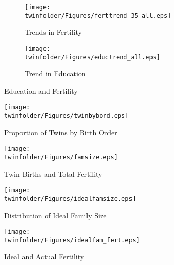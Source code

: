 \begin{figure}[htpb!]
\centering
\begin{subfigure}{.5\textwidth}
  \centering
  \texttt{[image: \\twinfolder/Figures/ferttrend\_35\_all.eps]}
  \caption{Trends in Fertility}
  \label{TWINfig:fertrend}
\end{subfigure}%
\begin{subfigure}{.5\textwidth}
  \centering
  \texttt{[image: \\twinfolder/Figures/eductrend\_all.eps]}
  \caption{Trend in Education}
  \label{TWINfig:eductrend}
\end{subfigure}
\caption{Education and Fertility}
\label{TWINfig:trends}
\end{figure}
\vspace{1cm}

\begin{figure}[htpb!]
\begin{center}
\caption{Proportion of Twins by Birth Order}
\label{TWINfig:bord}
\texttt{[image: \\twinfolder/Figures/twinbybord.eps]} 
\end{center}
\end{figure}

\begin{figure}[htpb!]
\begin{center}
\caption{Twin Births and Total Fertility}
\label{TWINfig:births}
\texttt{[image: \\twinfolder/Figures/famsize.eps]} 
\end{center}
\end{figure}

\begin{figure}[htpb!]
\begin{center}
\caption{Distribution of Ideal Family Size}
\label{TWINfig:ideal}
\texttt{[image: \\twinfolder/Figures/idealfamsize.eps]} 
\end{center}
\end{figure}

\begin{figure}[htpb!]
\begin{center}
\caption{Ideal and Actual Fertility}
\label{TWINfig:idealactual}
\texttt{[image: \\twinfolder/Figures/idealfam\_fert.eps]} 
\end{center}
\end{figure}

